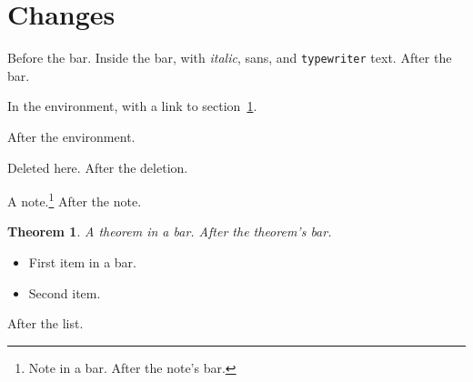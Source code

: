 \documentclass{article}
\newtheorem{theorem}{Theorem}
\begin{document}
\section{Changes}\label{changes}

Before the bar. \cbstart Inside the bar, with \emph{italic},
\textsf{sans}, and \texttt{typewriter} text.\cbend{} After the bar.

\begin{changebar}
In the environment, with a link to section~\ref{changes}.
\end{changebar}
After the environment.

Deleted here.\cbdelete{} After the deletion.

A note.\footnote{\cbstart Note in a bar.\cbend{} After the note's bar.}
After the note.

\begin{theorem}
\cbstart A theorem in a bar.\cbend{} After the theorem's bar.
\end{theorem}

\begin{itemize}
\item \cbstart First item in a bar.\cbend
\item Second item.
\end{itemize}
After the list.
\end{document}
